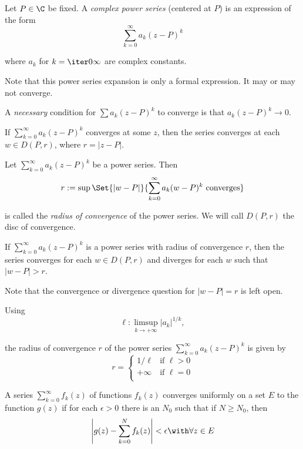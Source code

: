 \label{b9a7c59}

Let $P\in\C$ be fixed. A \textit{complex power series} (centered at $P$) is an
expression of the form
$$
  \sum_{k=0}^\infty a_k(z-P)^k
$$

where $a_k$ for $k=\iter0\infty$ are complex constants.

Note that this power series expansion is only a formal expression. It may or
may not converge.

A \textit{necessary} condition for $\sum a_k(z-P)^k$ to converge is that
$a_k(z-P)^k\to0$.

\label{d5d5bdc}

If $\sum_{k=0}^\infty a_k(z-P)^k$ converges at some $z$, then the series
converges at each $w\in D(P,r)$, where $r=|z-P|$.

\label{da6e337}

Let $\sum_{k=0}^\infty a_k(z-P)^k$ be a power series. Then
$$
  r:=\sup\Set{|w-P|}{\sum_{k=0}^\infty a_k(w-P)^k\text{ converges}}
$$

is called the \textit{radius of convergence} of the power series. We will call
$D(P,r)$ the disc of convergence.

\label{c7d0e1d}

If $\sum_{k=0}^\infty a_k(z-P)^k$ is a power series with radius of convergence
$r$, then the series converges for each $w\in D(P,r)$ and diverges for each $w$
such that $|w-P|>r$.

Note that the convergence or divergence question for $|w-P|=r$ is left open.

\label{a9ba20f}

Using
$$
  \ell:\limsup_{k\to+\infty}|a_k|^{1/k},
$$

the radius of convergence $r$ of the power series $\sum_{k=0}^\infty
a_k(z-P)^k$ is given by
\begin{equation*}
  r=\begin{cases}
    1/\ell  & \text{if } \ell>0 \\
    +\infty & \text{if } \ell=0 \\
  \end{cases}
\end{equation*}

\label{bba67e4}

A series $\sum_{k=0}^\infty f_k(z)$ of functions $f_k(z)$ converges uniformly
on a set $E$ to the function $g(z)$ if for each $\epsilon>0$ there is an $N_0$
such that if $N\geq N_0$, then
$$
  \left|g(z)-\sum_{k=0}^N f_k(z)\right|<\epsilon\with\forall z\in E
$$

